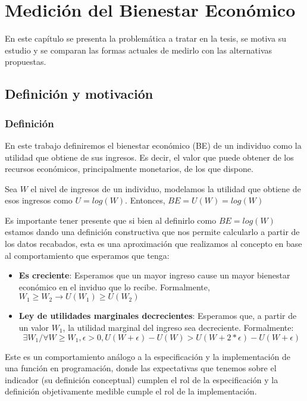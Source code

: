 \chapter{Medición del Bienestar Económico} \label{chapter:mediciones_bienestar_economico}

En este capítulo se presenta la problemática a tratar en la tesis, se motiva su estudio y se comparan las formas actuales de medirlo con las alternativas propuestas.

\section{Definición y motivación}

\subsection{Definición}

En este trabajo definiremos el bienestar económico (BE) de un individuo como la utilidad que obtiene de sus ingresos. Es decir, el valor que puede obtener de los recursos económicos, principalmente monetarios, de los que dispone.

Sea $W$ el nivel de ingresos de un individuo, modelamos la utilidad que obtiene de esos ingresos como $U = log(W)$. Entonces, $BE = U(W) = log(W)$

Es importante tener presente que si bien al definirlo como $BE = log(W)$ estamos dando una definición constructiva que nos permite calcularlo a partir de los datos recabados, esta es una aproximación que realizamos al concepto en base al comportamiento que esperamos que tenga:

\begin{itemize}
    \item \textbf{Es creciente}: Esperamos que un mayor ingreso cause un mayor bienestar económico en el inviduo que lo recibe. Formalmente, $W_1 \geq W_2 \rightarrow U(W_1) \geq U(W_2)$
    \item \textbf{Ley de utilidades marginales decrecientes}: Esperamos que, a partir de un valor $W_1$, la utilidad marginal del ingreso sea decreciente. Formalmente:
    $$
    \exists W_1 / \forall W \geq W_1, \epsilon > 0, U(W+\epsilon)-U(W) > U(W+2*\epsilon)-U(W+\epsilon)
    $$
\end{itemize}

Este es un comportamiento análogo a la especificación y la implementación de una función en programación, donde las expectativas que tenemos sobre el indicador (su definición conceptual) cumplen el rol de la especificación y la definición objetivamente medible cumple el rol de la implementación.


